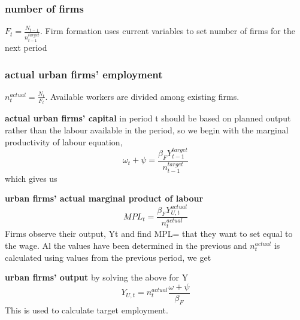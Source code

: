 \subsubsection{number of firms} $F_{t}=\frac{N_{t-1}}{n^{target}_{t-1}}$. Firm formation uses current variables to set number of firms for the next period 

\subsubsection{actual urban firms' employment} 
$n_t^{actual}= \frac{N_t}{F_t} $. Available workers are divided among existing firms.   


\textbf{actual urban firms' capital} in period t should be based on planned output rather than the labour available in the period, so we begin with the marginal productivity of labour equation, \[\omega_{t}+\psi = \frac{\beta_{F}Y^{target}_{t-1}}{n_{t-1}^{target}}\]
which gives us 


\textbf{urban firms' actual marginal product of labour}
\[MPL_{t} = \frac{\beta_{F}Y^{actual}_{U,t}}{n_t^{actual}}\] \noindent Firms observe their output, Yt and find  MPL= that they want to set equal to the wage. Al the values have been determined in the previous  and $n^{actual}_t$ is calculated using values from the  previous period, we get

\textbf{urban firms' output} by solving the above for Y
\[Y_{U,t}=  n_t^{actual}\frac{\omega+\psi}{\beta_{F}} \] 
This is used to calculate target employment.


